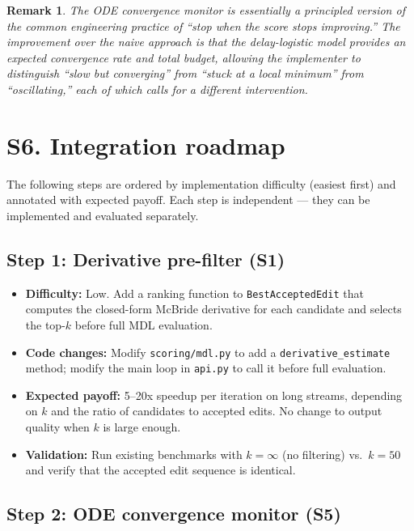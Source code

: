 \documentclass[11pt]{article}
\newtheorem{remark}{Remark}
\begin{document}
\begin{remark}
The ODE convergence monitor is essentially a principled version of the common engineering practice of ``stop when the score stops improving.''  The improvement over the naive approach is that the delay-logistic model provides an \emph{expected} convergence rate and total budget, allowing the implementer to distinguish ``slow but converging'' from ``stuck at a local minimum'' from ``oscillating,'' each of which calls for a different intervention.
\end{remark}

\section{S6. Integration roadmap}

The following steps are ordered by implementation difficulty (easiest first) and annotated with expected payoff.  Each step is independent --- they can be implemented and evaluated separately.

\subsection{Step 1: Derivative pre-filter (S1)}

\begin{itemize}
  \item \textbf{Difficulty:} Low.  Add a ranking function to \texttt{BestAcceptedEdit} that computes the closed-form McBride derivative for each candidate and selects the top-$k$ before full MDL evaluation.
  \item \textbf{Code changes:} Modify \texttt{scoring/mdl.py} to add a \texttt{derivative\_estimate} method; modify the main loop in \texttt{api.py} to call it before full evaluation.
  \item \textbf{Expected payoff:} 5--20x speedup per iteration on long streams, depending on $k$ and the ratio of candidates to accepted edits.  No change to output quality when $k$ is large enough.
  \item \textbf{Validation:} Run existing benchmarks with $k = \infty$ (no filtering) vs.\ $k = 50$ and verify that the accepted edit sequence is identical.
\end{itemize}

\subsection{Step 2: ODE convergence monitor (S5)}
\end{document}
